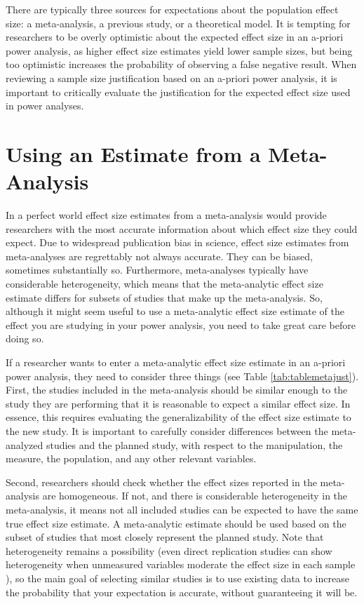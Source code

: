 \documentclass[
  oneside]{book}
\begin{document}
There are typically three sources for expectations about the population effect size: a meta-analysis, a previous study, or a theoretical model. It is tempting for researchers to be overly optimistic about the expected effect size in an a-priori power analysis, as higher effect size estimates yield lower sample sizes, but being too optimistic increases the probability of observing a false negative result. When reviewing a sample size justification based on an a-priori power analysis, it is important to critically evaluate the justification for the expected effect size used in power analyses.

\hypertarget{using-an-estimate-from-a-meta-analysis}{%
\section{Using an Estimate from a Meta-Analysis}\label{using-an-estimate-from-a-meta-analysis}}

In a perfect world effect size estimates from a meta-analysis would provide researchers with the most accurate information about which effect size they could expect. Due to widespread publication bias in science, effect size estimates from meta-analyses are regrettably not always accurate. They can be biased, sometimes substantially so. Furthermore, meta-analyses typically have considerable heterogeneity, which means that the meta-analytic effect size estimate differs for subsets of studies that make up the meta-analysis. So, although it might seem useful to use a meta-analytic effect size estimate of the effect you are studying in your power analysis, you need to take great care before doing so.

If a researcher wants to enter a meta-analytic effect size estimate in an a-priori power analysis, they need to consider three things (see Table \ref{tab:tablemetajust}). First, the studies included in the meta-analysis should be similar enough to the study they are performing that it is reasonable to expect a similar effect size. In essence, this requires evaluating the generalizability of the effect size estimate to the new study. It is important to carefully consider differences between the meta-analyzed studies and the planned study, with respect to the manipulation, the measure, the population, and any other relevant variables.

Second, researchers should check whether the effect sizes reported in the meta-analysis are homogeneous. If not, and there is considerable heterogeneity in the meta-analysis, it means not all included studies can be expected to have the same true effect size estimate. A meta-analytic estimate should be used based on the subset of studies that most closely represent the planned study. Note that heterogeneity remains a possibility (even direct replication studies can show heterogeneity when unmeasured variables moderate the effect size in each sample \citep{kenny_unappreciated_2019, olsson-collentine_heterogeneity_2020}), so the main goal of selecting similar studies is to use existing data to increase the probability that your expectation is accurate, without guaranteeing it will be.
\end{document}
